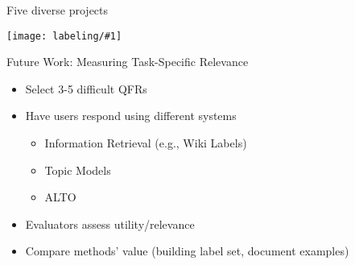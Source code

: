 \documentclass[compress]{beamer}
\newcommand{\gfx}[2]{
\begin{center}
	\texttt{[image: labeling/\#1]}
\end{center}
}
\begin{document}
\begin{frame}{Five diverse projects}

  \gfx{example_labels}{.95}
\end{frame}

\begin{frame}{Future Work: Measuring Task-Specific Relevance}

\begin{itemize}
  \item Select 3-5 difficult QFRs
  \item Have users respond using different systems
    \begin{itemize}
      \item Information Retrieval (e.g., Wiki Labels)
      \item Topic Models
      \item ALTO
    \end{itemize}
  \item Evaluators assess utility/relevance
  \item Compare methods' value (building label set, document examples)
\end{itemize}

\end{frame}
\end{document}
